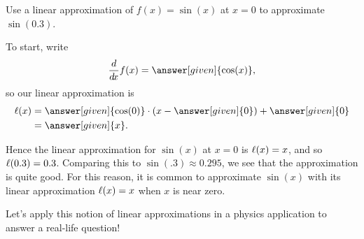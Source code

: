 \documentclass[handout,nooutcomes]{ximera}
\begin{document}
\begin{example}%
Use a linear approximation of $f(x) =\sin(x)$ at $x=0$ to approximate
$\sin(0.3)$.
\begin{explanation}
To start, write
\[
\ddx f(x) = \answer[given]{\cos(x)},
\]
so our linear approximation is
\begin{align*}
\l(x) &= \answer[given]{\cos(0)}\cdot(x-\answer[given]{0}) + \answer[given]{0}\\
&= \answer[given]{x}.
\end{align*}
\begin{image}
\end{image}
Hence the linear approximation for $\sin(x)$ at $x=0$ is $\ell(x) = x$,
and so $\ell(0.3) = 0.3$.  Comparing this to $\sin(.3) \approx 0.295$,
we see that the approximation is quite good. For this reason, it is common
to approximate $\sin(x)$ with its linear approximation $\ell(x) = x$
when $x$ is near zero.  
\end{explanation}
\end{example}

Let's apply this notion of linear approximations in a physics application to
answer a real-life question!
\end{document}
